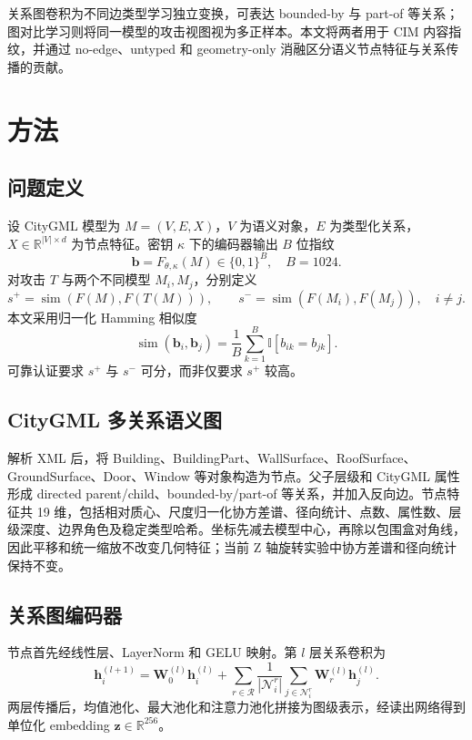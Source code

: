 \documentclass[UTF8,fontset=fandol,12pt]{ctexart}
\begin{document}
关系图卷积为不同边类型学习独立变换，可表达 bounded-by 与 part-of 等关系；图对比学习则将同一模型的攻击视图视为多正样本。本文将两者用于 CIM 内容指纹，并通过 no-edge、untyped 和 geometry-only 消融区分语义节点特征与关系传播的贡献。

\section{方法}
\subsection{问题定义}
设 CityGML 模型为 $M=(V,E,X)$，$V$ 为语义对象，$E$ 为类型化关系，$X\in\mathbb R^{|V|\times d}$ 为节点特征。密钥 $\kappa$ 下的编码器输出 $B$ 位指纹
\begin{equation}
 \bm b=F_{\theta,\kappa}(M)\in\{0,1\}^{B},\quad B=1024.
\end{equation}
对攻击 $T$ 与两个不同模型 $M_i,M_j$，分别定义
\begin{equation}
s^+=\operatorname{sim}(F(M),F(T(M))),\qquad
s^-=\operatorname{sim}(F(M_i),F(M_j)),\quad i\neq j.
\end{equation}
本文采用归一化 Hamming 相似度
\begin{equation}
 \operatorname{sim}(\bm b_i,\bm b_j)=\frac{1}{B}\sum_{k=1}^{B}\mathbb I[b_{ik}=b_{jk}].
\end{equation}
可靠认证要求 $s^+$ 与 $s^-$ 可分，而非仅要求 $s^+$ 较高。

\subsection{CityGML 多关系语义图}
解析 XML 后，将 Building、BuildingPart、WallSurface、RoofSurface、GroundSurface、Door、Window 等对象构造为节点。父子层级和 CityGML 属性形成 directed parent/child、bounded-by/part-of 等关系，并加入反向边。节点特征共 19 维，包括相对质心、尺度归一化协方差谱、径向统计、点数、属性数、层级深度、边界角色及稳定类型哈希。坐标先减去模型中心，再除以包围盒对角线，因此平移和统一缩放不改变几何特征；当前 Z 轴旋转实验中协方差谱和径向统计保持不变。

\subsection{关系图编码器}
节点首先经线性层、LayerNorm 和 GELU 映射。第 $l$ 层关系卷积为
\begin{equation}
 \bm h_i^{(l+1)}=\bm W_0^{(l)}\bm h_i^{(l)}+
 \sum_{r\in\mathcal R}\frac{1}{|\mathcal N_i^r|}
 \sum_{j\in\mathcal N_i^r}\bm W_r^{(l)}\bm h_j^{(l)}.
\end{equation}
两层传播后，均值池化、最大池化和注意力池化拼接为图级表示，经读出网络得到单位化 embedding $\bm z\in\mathbb R^{256}$。
\end{document}
